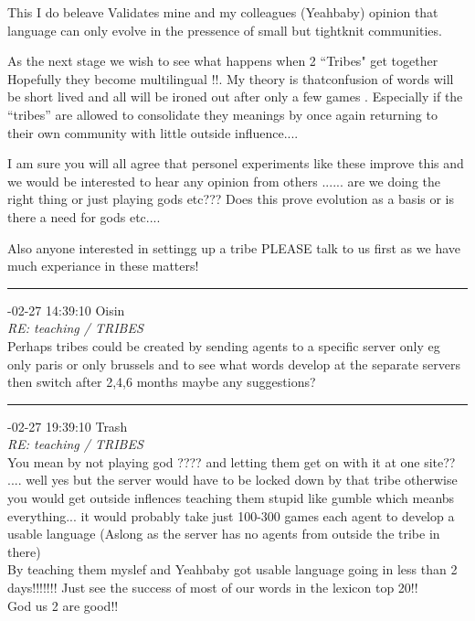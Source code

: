 \begin{mail}
This I do beleave Validates mine and my colleagues (Yeahbaby) opinion that language can only evolve in the pressence of small but tightknit communities.

As the next stage we wish to see what happens when 2 ``Tribes" get together Hopefully they become multilingual !!.
My theory is thatconfusion of words will be short lived and all will be ironed out after only a few games . Especially if the ``tribes'' are allowed to consolidate they meanings by once again returning to their own community with little outside  influence....

I am sure you will all agree that personel experiments like these improve this and we would be interested to hear any opinion from others ...... are we doing the right thing or just playing gods etc???
 Does this prove evolution as a basis or is there a need for gods etc.... 

Also anyone interested in settingg up a tribe PLEASE talk to us first as we have much experiance in these matters!\\

\rule{0.8\textwidth}{.4pt}

{-02-27 14:39:10 Oisin}\\
{\itshape RE: teaching / TRIBES}\\
Perhaps tribes could be created by sending agents to a specific server only eg only paris or only brussels and to see what words develop at the separate servers then switch after 2,4,6 months maybe any suggestions?\\

\rule{0.8\textwidth}{.4pt}

{-02-27 19:39:10 Trash}\\
{\itshape RE: teaching / TRIBES}\\
You mean by not playing god ???? and letting them get on with it at one site?? .... well yes but the server would have to be locked down by that tribe otherwise you would get outside inflences teaching them stupid like gumble which meanbs everything... it would probably take just 100-300 games each agent to develop a usable language (Aslong as the server has no agents from outside the  tribe in there)\\
By teaching them myslef and Yeahbaby got usable language going in  less than 2 days!!!!!!! Just see the success of most of our words in the lexicon top 20!!\\
God us 2 are good!!\\


\end{mail}
